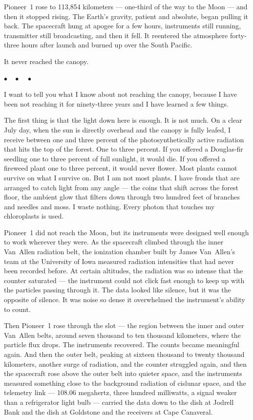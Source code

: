 \documentclass[12pt, letterpaper]{article}
\begin{document}
Pioneer~1 rose to 113,854 kilometers --- one-third of the way to the Moon --- and then it stopped rising. The Earth's gravity, patient and absolute, began pulling it back. The spacecraft hung at apogee for a few hours, instruments still running, transmitter still broadcasting, and then it fell. It reentered the atmosphere forty-three hours after launch and burned up over the South Pacific.

It never reached the canopy.

\begin{center}
$\bullet\quad\bullet\quad\bullet$
\end{center}

I want to tell you what I know about not reaching the canopy, because I have been not reaching it for ninety-three years and I have learned a few things.

The first thing is that the light down here is enough. It is not much. On a clear July day, when the sun is directly overhead and the canopy is fully leafed, I receive between one and three percent of the photosynthetically active radiation that hits the top of the forest. One to three percent. If you offered a Douglas-fir seedling one to three percent of full sunlight, it would die. If you offered a fireweed plant one to three percent, it would never flower. Most plants cannot survive on what I survive on. But I am not most plants. I have fronds that are arranged to catch light from any angle --- the coins that shift across the forest floor, the ambient glow that filters down through two hundred feet of branches and needles and moss. I waste nothing. Every photon that touches my chloroplasts is used.

Pioneer~1 did not reach the Moon, but its instruments were designed well enough to work wherever they were. As the spacecraft climbed through the inner Van~Allen radiation belt, the ionization chamber built by James Van~Allen's team at the University of Iowa measured radiation intensities that had never been recorded before. At certain altitudes, the radiation was so intense that the counter saturated --- the instrument could not click fast enough to keep up with the particles passing through it. The data looked like silence, but it was the opposite of silence. It was noise so dense it overwhelmed the instrument's ability to count.

Then Pioneer~1 rose through the slot --- the region between the inner and outer Van~Allen belts, around seven thousand to ten thousand kilometers, where the particle flux drops. The instruments recovered. The counts became meaningful again. And then the outer belt, peaking at sixteen thousand to twenty thousand kilometers, another surge of radiation, and the counter struggled again, and then the spacecraft rose above the outer belt into quieter space, and the instruments measured something close to the background radiation of cislunar space, and the telemetry link --- 108.06 megahertz, three hundred milliwatts, a signal weaker than a refrigerator light bulb --- carried the data down to the dish at Jodrell Bank and the dish at Goldstone and the receivers at Cape Canaveral.
\end{document}
